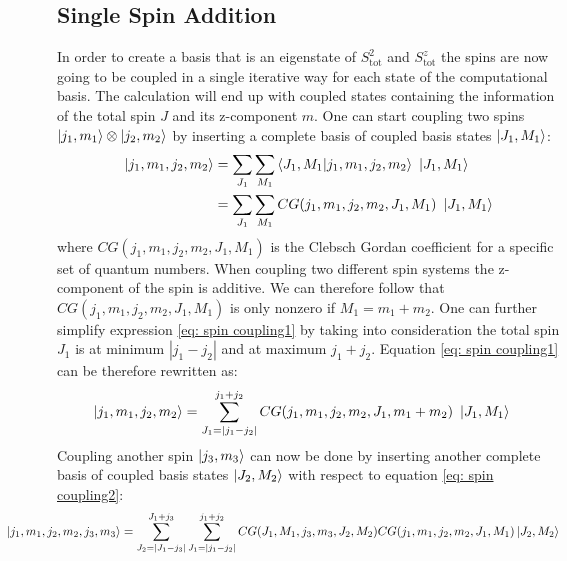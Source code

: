 \documentclass{scrartcl}
\newcommand{\innerp}[2]{\left\langle #1 \vert #2 \right\rangle}
\begin{document}
\subsection{Single Spin Addition} 
In order to create a basis that is an eigenstate of $S^2_{\mathrm{tot}}$ and $S^z_{\mathrm{tot}}$ the spins are now going to be coupled in a single iterative way for each state of the computational basis. The calculation will end up with coupled states containing the information of the total spin $J$ and its z-component $m$. One can start coupling two spins $\ket{j_1,m_1}\otimes\ket{j_2,m_2}$ by inserting a complete basis of coupled basis states $\ket{J_1, M_1}$:
\begin{equation} 
\begin{aligned}
    \ket{j_1,m_1,j_2,m_2}&=\sum _{J_1} \sum _{M_1} \innerp{J_1, M_1}{j_1,m_1,j_2,m_2} \ \ket{J_1, M_1} \\
    &= \sum _{J_1} \sum _{M_1} CG(j_1,m_1,j_2,m_2,J_1,M_1) \ \ket{J_1, M_1}
    \label{eq: spin coupling1}
\end{aligned}
\end{equation}
where $CG(j_1,m_1,j_2,m_2,J_1,M_1)$ is the Clebsch Gordan coefficient for a specific set of quantum numbers. When coupling two different spin systems the z-component of the spin is additive. We can therefore follow that $CG(j_1,m_1,j_2,m_2,J_1,M_1)$ is only nonzero if $M_1=m_1+m_2$. One can further simplify expression \ref{eq: spin coupling1} by taking into consideration the total spin $J_1$ is at minimum $|j_1-j_2|$ and at maximum $j_1+j_2$. Equation \ref{eq: spin coupling1} can be therefore rewritten as:
\begin{equation}
\begin{aligned}
    \ket{j_1,m_1,j_2,m_2}&= \sum^{j_1+j_2}_{J_1=|j_1-j_2|} CG(j_1,m_1,j_2,m_2,J_1,m_1+m_2) \ \ket{J_1, M_1}
    \label{eq: spin coupling2}
\end{aligned}
\end{equation}
\newpage \noindent Coupling another spin $\ket{j_3,m_3}$ can now be done by inserting another complete basis of coupled basis states $\ket{J_2, M_2}$ with respect to equation \ref{eq: spin coupling2}:
\begin{equation}
\begin{aligned}
    \hspace{-1.5cm} \ket{j_1,m_1,j_2,m_2,j_3,m_3} =\sum^{J_1+j_3}_{J_2=|J_1-j_3|}\sum^{j_1+j_2}_{J_1=|j_1-j_2|}CG(J_1,M_1,j_3,m_3,J_2,M_2) CG(j_1,m_1,j_2,m_2,J_1,M_1)\ket{J_2, M_2}
    \label{eq: spin coupling3}
\end{aligned}
\end{equation}
\end{document}
